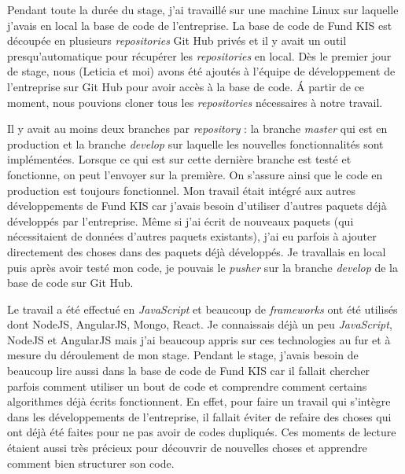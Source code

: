 Pendant toute la durée du stage, j'ai travaillé sur une machine Linux sur laquelle j'avais en local la base de code de l'entreprise. La base de code de Fund KIS est découpée en plusieurs \textit{repositories} Git Hub privés et il y avait un outil presqu'automatique pour récupérer les \textit{repositories} en local. Dès le premier jour de stage, nous (Leticia et moi) avons été ajoutés à l'équipe de développement de l'entreprise sur Git Hub pour avoir accès à la base de code. \'A partir de ce moment, nous pouvions cloner tous les \textit{repositories} nécessaires à notre travail.


\vspace{3mm}
Il y avait au moins deux branches par \textit{repository} : la branche \textit{master} qui est en production et la branche \textit{develop} sur laquelle les nouvelles fonctionnalités sont implémentées. Lorsque ce qui est sur cette dernière branche est testé et fonctionne, on peut l'envoyer sur la première. On s'assure ainsi que le code en production est toujours fonctionnel. Mon travail était intégré aux autres développements de Fund KIS car j'avais besoin d'utiliser d'autres paquets déjà développés par l'entreprise. Même si j'ai écrit de nouveaux paquets (qui nécessitaient de données d'autres paquets existants), j'ai eu parfois à ajouter directement des choses dans des paquets déjà développés. Je travallais en local puis après avoir testé mon code, je pouvais le \textit{pusher} sur la branche \textit{develop} de la base de code sur Git Hub.

\vspace{3mm}

Le travail a été effectué en \textit{JavaScript} et beaucoup de \textit{frameworks} ont été utilisés dont NodeJS, AngularJS, Mongo, React. Je connaissais déjà un peu \textit{JavaScript}, NodeJS et AngularJS mais j'ai beaucoup appris sur ces technologies au fur et à mesure du déroulement de mon stage. Pendant le stage, j'avais besoin de beaucoup lire aussi dans la base de code de Fund KIS car il fallait chercher parfois comment utiliser un bout de code et comprendre comment certains algorithmes déjà écrits fonctionnent. En effet, pour faire un travail qui s'intègre dans les développements de l'entreprise, il fallait éviter de refaire des choses qui ont déjà été faites pour ne pas avoir de codes dupliqués. Ces moments de lecture étaient aussi très précieux pour découvrir de nouvelles choses et apprendre comment bien structurer son code.
